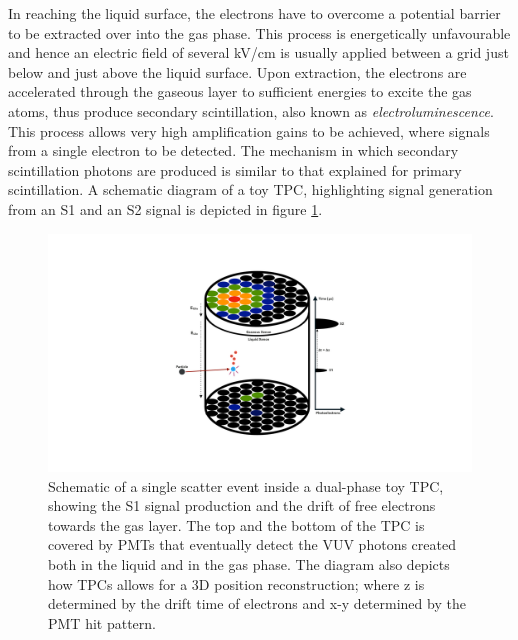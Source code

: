 In reaching the liquid surface, the electrons have to overcome a potential barrier to be extracted over into the gas phase. This process is energetically unfavourable and hence an electric field of several kV/cm is usually applied between a grid just below and just above the liquid surface. Upon extraction, the electrons are accelerated through the gaseous layer to sufficient energies to excite the gas atoms, thus produce secondary scintillation, also known as \textit{electroluminescence}. This process allows very high amplification gains to be achieved, where signals from a single electron to be detected. The mechanism in which secondary scintillation photons are produced is similar to that explained for primary scintillation. A schematic diagram of a toy TPC, highlighting signal generation from an S1 and an S2 signal is depicted in figure \ref{fig:tpc_diagram_toy}. 
%
\begin{figure}[hb!]
    \begin{center}
        \includegraphics[scale=0.30]{Chapter_2/Figures/TPC_Diagram.pdf}
        \caption[Schematic of a single scatter event inside a dual-phase toy TPC, showing the S1 signal production and the drift of free electrons towards the gas layer]%
        {Schematic of a single scatter event inside a dual-phase toy TPC, showing the S1 signal production and the drift of free electrons towards the gas layer. The top and the bottom of the TPC is covered by PMTs that eventually detect the VUV photons created both in the liquid and in the gas phase. The diagram also depicts how TPCs allows for a 3D position reconstruction; where z is determined by the drift time of electrons and x-y determined by the PMT hit pattern.}
        \label{fig:tpc_diagram_toy}
        \end{center}
\end{figure}
%


